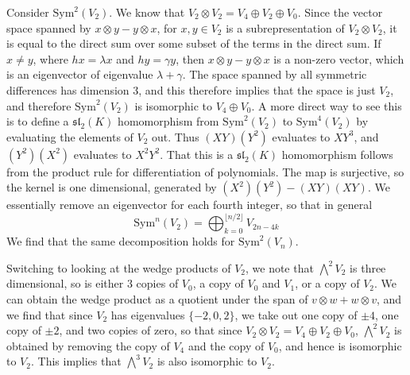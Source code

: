 \begin{example}
    Consider $\text{Sym}^2(V_2)$. We know that $V_2 \otimes V_2 = V_4 \oplus V_2 \oplus V_0$. Since the vector space spanned by $x \otimes y - y \otimes x$, for $x, y \in V_2$ is a subrepresentation of $V_2 \otimes V_2$, it is equal to the direct sum over some subset of the terms in the direct sum. If $x \neq y$, where $hx = \lambda x$ and $hy = \gamma y$, then $x \otimes y - y \otimes x$ is a non-zero vector, which is an eigenvector of eigenvalue $\lambda + \gamma$. The space spanned by all symmetric differences has dimension 3, and this therefore implies that the space is just $V_2$, and therefore $\text{Sym}^2(V_2)$ is isomorphic to $V_4 \oplus V_0$. A more direct way to see this is to define a $\mathfrak{sl}_2(K)$ homomorphism from $\text{Sym}^2(V_2)$ to $\text{Sym}^4(V_2)$ by evaluating the elements of $V_2$ out. Thus $(XY)(Y^2)$ evaluates to $XY^3$, and $(Y^2)(X^2)$ evaluates to $X^2Y^2$. That this is a $\mathfrak{sl}_2(K)$ homomorphism follows from the product rule for differentiation of polynomials. The map is surjective, so the kernel is one dimensional, generated by $(X^2)(Y^2) - (XY)(XY)$. We essentially remove an eigenvector for each fourth integer, so that in general
    \[ \text{Sym}^n(V_2) = \bigoplus_{k = 0}^{\lfloor n/2 \rfloor} V_{2n - 4k} \]
    We find that the same decomposition holds for $\text{Sym}^2(V_n)$.
\end{example}

\begin{example}
    Switching to looking at the wedge products of $V_2$, we note that $\bigwedge^2 V_2$ is three dimensional, so is either 3 copies of $V_0$, a copy of $V_0$ and $V_1$, or a copy of $V_2$. We can obtain the wedge product as a quotient under the span of $v \otimes w + w \otimes v$, and we find that since $V_2$ has eigenvalues $\{ -2, 0, 2 \}$, we take out one copy of $\pm 4$, one copy of $\pm 2$, and two copies of zero, so that since $V_2 \otimes V_2 = V_4 \oplus V_2 \oplus V_0$, $\bigwedge^2 V_2$ is obtained by removing the copy of $V_4$ and the copy of $V_0$, and hence is isomorphic to $V_2$. This implies that $\bigwedge^3 V_2$ is also isomorphic to $V_2$.
\end{example}

